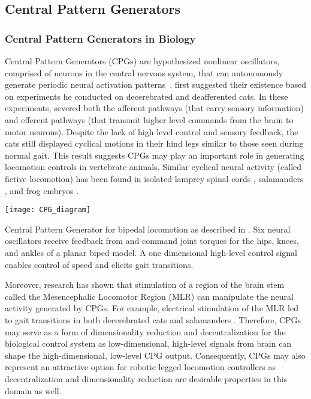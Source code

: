 \subsection{Central Pattern Generators}
\subsubsection{Central Pattern Generators in Biology}
Central Pattern Generators (CPGs) are hypothesized nonlinear
oscillators, comprised of neurons in the central nervous system, that can
autonomously generate periodic neural activation
patterns~\citep{ijspeert2008central}.  \citet{brown1911intrinsic} first
suggested their existence based on experiments he conducted on decerebrated and
deafferented cats. In these experiments, \citeauthor{brown1911intrinsic} severed
both the afferent pathways (that carry sensory information) and efferent
pathways (that transmit higher level commands from the brain to motor neurons).
Despite the lack of high level control and sensory feedback, the cats still
displayed cyclical motions in their hind legs similar to those seen during
normal gait. This result suggests CPGs may play an important role in generating
locomotion controls in vertebrate animals. Similar cyclical neural activity
(called fictive locomotion) has been found in isolated lamprey spinal cords
\citep{cohen1980neuronal}, salamanders \citep{delvolve1999fictive}, and frog
embryos \citep{soffe1982tonic}. 

\begin{marginfigure}
    \centering
    \texttt{[image: CPG\_diagram]}
    \caption{Central Pattern Generator for bipedal locomotion as described in
    \citet{taga1991self}. Six neural oscillators receive feedback from and
    command joint torques for the hips, knees, and ankles of a planar biped
    model. A one dimensional high-level control signal enables control of speed
    and elicits gait transitions.}
    \label{fig:cpg_diagram}
\end{marginfigure}
Moreover, research has shown that stimulation of a region of the brain stem
called the Mesencephalic Locomotor Region (MLR) can manipulate the neural
activity generated by CPGs. For example, electrical stimulation of the MLR led
to gait transitions in both decerebrated cats \citep{shik1966control} and
salamanders \citep{cabelguen2003bimodal}.  Therefore, CPGs may serve as a form
of dimensionality reduction and decentralization for the biological control
system as low-dimensional, high-level signals from brain can shape the
high-dimensional, low-level CPG output. Consequently, CPGs may also represent
an attractive option for robotic legged locomotion controllers as
decentralization and dimensionality reduction are desirable properties in this
domain as well.

